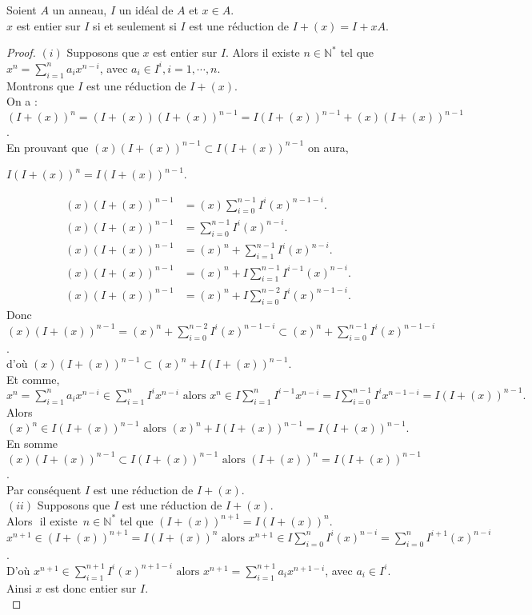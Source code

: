 \begin{maproposition}
	Soient $A$ un anneau, $I$ un idéal de $A$ et $x \in A$.\\
	$x$ est entier sur $I$ si et seulement si $I$ est une réduction de $I + (x) = I +xA $.
\end{maproposition}
\begin{proof}
	$(i)$ Supposons que $x$ est entier sur $I$. Alors il existe $n \in \mathbb{N^*}$ tel que $x^n = \displaystyle \sum_{i=1}^{n}{a_i x^{n-i}}$, avec $a_i \in I^i, i=1, \cdots ,n$.\\
	Montrons que $I$ est une réduction de $I + (x)$.\\
	On a : $(I+(x))^n = (I+(x))(I+(x))^{n-1}= I(I+(x))^{n-1} + (x)(I+(x))^{n-1}$.\\
	En prouvant que $(x)(I+(x))^{n-1} \subset I(I+(x))^{n-1}$ on aura,
	\begin{center}
		$I(I+(x))^{n} = I(I+(x))^{n-1}$.
	\end{center}
	\begin{align*}
		(x)(I+(x))^{n-1} &= (x)\displaystyle \sum_{i=0}^{n-1}{I^i (x)^{n-1-i}}.\\
		(x)(I+(x))^{n-1} &= \displaystyle \sum_{i=0}^{n-1}{I^i (x)^{n-i}}.\\
		(x)(I+(x))^{n-1} &= (x)^n + \displaystyle \sum_{i=1}^{n-1}{I^i (x)^{n-i}}.\\
		(x)(I+(x))^{n-1} &= (x)^n + I\displaystyle \sum_{i=1}^{n-1}{I^{i-1} (x)^{n-i}}.\\
		(x)(I+(x))^{n-1} &= (x)^n + I\displaystyle \sum_{i=0}^{n-2}{I^i (x)^{n-1-i}}.
	\end{align*}
	Donc $(x)(I+(x))^{n-1} = (x)^n + \displaystyle \sum_{i=0}^{n-2}{I^i (x)^{n-1-i}} \subset (x)^n + \displaystyle \sum_{i=0}^{n-1}{I^i (x)^{n-1-i}}$.\\
	d'où $(x)(I+(x))^{n-1} \subset (x)^n + I(I+(x))^{n-1}$.\\ Et comme, \\$x^n = \displaystyle \sum_{i=1}^{n}{a_i x^{n-i}} \in \displaystyle \sum_{i=1}^{n}{I^i x^{n-i}} \text{ alors } x^n \in I\displaystyle \sum_{i=1}^{n}{I^{i-1} x^{n-i}} = I\displaystyle \sum_{i=0}^{n-1}{I^i x^{n-1-i}} =I(I+(x))^{n-1}.$\\ Alors $(x)^n \in I(I+(x))^{n-1} \text{ alors } (x)^n + I(I+(x))^{n-1} = I(I+(x))^{n-1}$.\\
	En somme $(x)(I+(x))^{n-1} \subset I(I+(x))^{n-1} \text{ alors } (I+(x))^{n} = I(I+(x))^{n-1}$.\\
	Par conséquent $I$ est une réduction de $I + (x)$.\\
	$(ii)$ Supposons que $I$ est une réduction de $I + (x)$.\\
	Alors $\text{ il existe } \, n \in \mathbb{N^*}$ tel que $(I + (x))^{n+1} = I(I + (x))^{n}$.\\
	$x^{n+1} \in (I + (x))^{n+1} = I(I + (x))^{n} \text{ alors } x^{n+1} \in I\displaystyle \sum_{i=0}^{n}{I^i (x)^{n-i}} = \displaystyle \sum_{i=0}^{n}{I^{i+1} (x)^{n-i}}$.\\
	D'où $x^{n+1} \in \displaystyle \sum_{i=1}^{n+1}{I^i (x)^{n+1-i}} \text{ alors } x^{n+1} =  \displaystyle \sum_{i=1}^{n+1}{a_i x^{n+1-i}}$, avec $a_i \in I^i$. Ainsi $x$ est donc entier sur $I$.\\
\end{proof}
